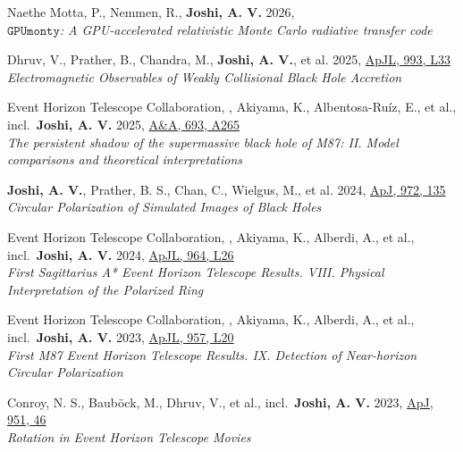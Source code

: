 \item Naethe Motta, P., Nemmen, R., \textbf{Joshi, A. V.} 2026, \href{https://ui.adsabs.harvard.edu/abs/2026arXiv260213198N}{\color{arxivcolor}{arXiv}}\\\textit{$\texttt{GPUmonty}$: A GPU-accelerated relativistic Monte Carlo radiative transfer code}

\item Dhruv, V., Prather, B., Chandra, M., \textbf{Joshi, A. V.}, et al. 2025, \href{https://ui.adsabs.harvard.edu/abs/2025ApJ...993L..33D}{ApJL, 993, L33}\\\textit{Electromagnetic Observables of Weakly Collisional Black Hole Accretion}

\item Event Horizon Telescope Collaboration, , Akiyama, K., Albentosa-Ruíz, E., et al., incl.\ \textbf{Joshi, A. V.} 2025, \href{https://ui.adsabs.harvard.edu/abs/2025A\&A...693A.265E}{A\&A, 693, A265}\\\textit{The persistent shadow of the supermassive black hole of M87: II. Model comparisons and theoretical interpretations}

\item \textbf{Joshi, A. V.}, Prather, B. S., Chan, C., Wielgus, M., et al. 2024, \href{https://ui.adsabs.harvard.edu/abs/2024ApJ...972..135J}{ApJ, 972, 135}\\\textit{Circular Polarization of Simulated Images of Black Holes}

\item Event Horizon Telescope Collaboration, , Akiyama, K., Alberdi, A., et al., incl.\ \textbf{Joshi, A. V.} 2024, \href{https://ui.adsabs.harvard.edu/abs/2024ApJ...964L..26E}{ApJL, 964, L26}\\\textit{First Sagittarius A* Event Horizon Telescope Results. VIII. Physical Interpretation of the Polarized Ring}

\item Event Horizon Telescope Collaboration, , Akiyama, K., Alberdi, A., et al., incl.\ \textbf{Joshi, A. V.} 2023, \href{https://ui.adsabs.harvard.edu/abs/2023ApJ...957L..20E}{ApJL, 957, L20}\\\textit{First M87 Event Horizon Telescope Results. IX. Detection of Near-horizon Circular Polarization}

\item Conroy, N. S., Bauböck, M., Dhruv, V., et al., incl.\ \textbf{Joshi, A. V.} 2023, \href{https://ui.adsabs.harvard.edu/abs/2023ApJ...951...46C}{ApJ, 951, 46}\\\textit{Rotation in Event Horizon Telescope Movies}

